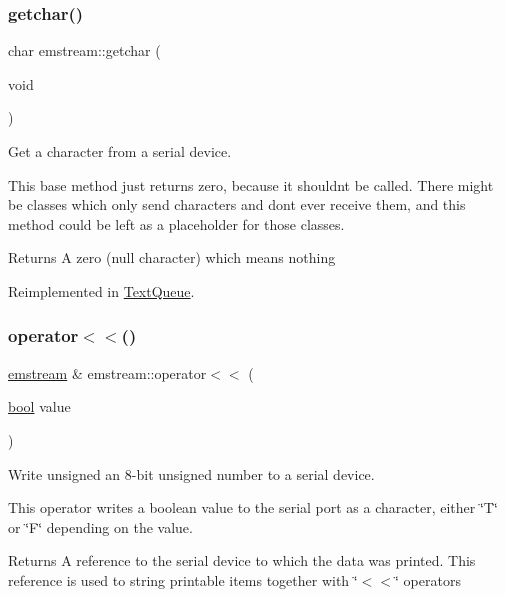 \subsubsection{\texorpdfstring{getchar()}{getchar()}}
{\footnotesize\ttfamily char emstream\+::getchar (\begin{DoxyParamCaption}\item[{void}]{ }\end{DoxyParamCaption})\hspace{0.3cm}{\ttfamily [virtual]}}



Get a character from a serial device. 

This base method just returns zero, because it shouldn\textquotesingle{}t be called. There might be classes which only send characters and don\textquotesingle{}t ever receive them, and this method could be left as a placeholder for those classes. \begin{DoxyReturn}{Returns}
A zero (null character) which means nothing 
\end{DoxyReturn}


Reimplemented in \mbox{\hyperlink{class_text_queue_ab682ee4d2cbad87e9496ca424fa03b0a}{Text\+Queue}}.

\mbox{\label{classemstream_a180fa065e30c2e97e957a97b70eb8eb4}} 
\subsubsection{\texorpdfstring{operator$<$$<$()}{operator<<()}\hspace{0.1cm}{\footnotesize\ttfamily [1/14]}}
{\footnotesize\ttfamily \mbox{\hyperlink{classemstream}{emstream}} \& emstream\+::operator$<$$<$ (\begin{DoxyParamCaption}\item[{\mbox{\hyperlink{group___motor___boolean___type_ga0ecf26b576b9a54eca656b9be7ba6a06}{bool}}}]{value }\end{DoxyParamCaption})}



Write unsigned an 8-\/bit unsigned number to a serial device. 

This operator writes a boolean value to the serial port as a character, either \char`\"{}\+T\char`\"{} or \char`\"{}\+F\char`\"{} depending on the value. \begin{DoxyReturn}{Returns}
A reference to the serial device to which the data was printed. This reference is used to string printable items together with \char`\"{}$<$$<$\char`\"{} operators 
\end{DoxyReturn}

